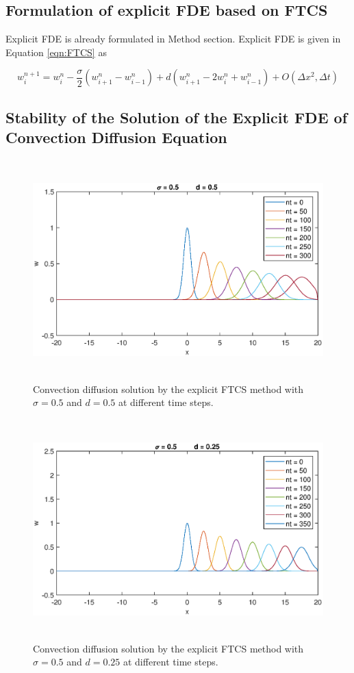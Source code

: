 \documentclass[letterpaper,12pt]{article}
\begin{document}
\subsection{Formulation of explicit FDE based on FTCS }

Explicit FDE is already formulated in Method section. Explicit FDE is given in Equation \ref{eqn:FTCS} as

\begin{equation}
	w_{i}^{n+1}= w_{i}^{n}-\frac{\sigma}{2}(w_{i+1}^{n}-w_{i-1}^{n})+d(w_{i+1}^{n}-2w_{i}^{n}+w_{i-1}^{n})+O(\Delta x^2,\Delta t) 
	\tag*{(11)}
\end{equation}

\vspace{1cm}

\subsection{Stability of the Solution of the Explicit FDE of Convection Diffusion Equation}
\begin{figure}[!ht] 
	\centering 
	\includegraphics[max height=8.5cm]{graphs/FTCS/ConvectionDiffusion/sigma05d05.eps}
	\caption{Convection diffusion solution by the explicit FTCS method with $\sigma= 0.5$ and $d=0.5$ at different time steps.}
 	\label{fig:FTCSsigma05d05}
\end{figure}
\begin{figure}[!ht] 
	\centering 
	\includegraphics[max height=8.5cm]{graphs/FTCS/ConvectionDiffusion/sigma05d025.eps}
	\caption{Convection diffusion solution by the explicit FTCS method with $\sigma= 0.5$ and $d=0.25$ at different time steps.}
	 \label{fig:FTCSsigma05d025}
\end{figure}
\end{document}
